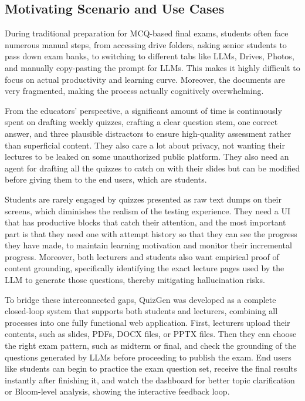 \documentclass[12pt,a4paper]{article}
\begin{document}
\subsection{Motivating Scenario and Use Cases}

During traditional preparation for MCQ-based final exams, students often
face numerous manual steps, from accessing drive folders, asking senior
students to pass down exam banks, to switching to different tabs like LLMs,
Drives, Photos, and manually copy-pasting the prompt for LLMs. This makes it
highly difficult to focus on actual productivity and learning curve.
Moreover, the documents are very fragmented, making the process actually
cognitively overwhelming.

From the educators' perspective, a significant amount of time is continuously
spent on drafting weekly quizzes, crafting a clear question stem, one correct
answer, and three plausible distractors to ensure high-quality assessment
rather than superficial content. They also care a lot about privacy, not
wanting their lectures to be leaked on some unauthorized public platform.
They also need an agent for drafting all the quizzes to catch on with their
slides but can be modified before giving them to the end users, which are
students.

Students are rarely engaged by quizzes presented as raw text dumps on their
screens, which diminishes the realism of the testing experience. They need a
UI that has productive blocks that catch their attention, and the most
important part is that they need one with attempt history so that they can
see the progress they have made, to maintain learning motivation and monitor
their incremental progress. Moreover, both lecturers and students also want
empirical proof of content grounding, specifically identifying the exact
lecture pages used by the LLM to generate those questions, thereby
mitigating hallucination risks.

To bridge these interconnected gaps, QuizGen was developed as a complete
closed-loop system that supports both students and lecturers, combining all
processes into one fully functional web application. First, lecturers upload
their contents, such as slides, PDFs, DOCX files, or PPTX files. Then they
can choose the right exam pattern, such as midterm or final, and check the
grounding of the questions generated by LLMs before proceeding to publish
the exam. End users like students can begin to practice the exam question
set, receive the final results instantly after finishing it, and watch the
dashboard for better topic clarification or Bloom-level analysis, showing the
interactive feedback loop.
\end{document}
